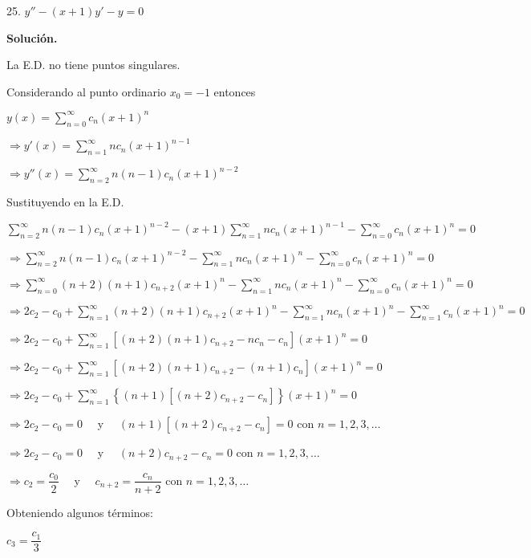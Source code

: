 \documentclass[fleqn]{article}
\begin{document}
    25. $ y'' - (x + 1)y' - y = 0 $

    \textbf{Solución.}

    La E.D. no tiene puntos singulares.

    Considerando al punto ordinario $ x_0 = -1 $ entonces
    
    $ y(x) = \displaystyle \sum_{n=0}^{\infty} c_n (x+1)^n $

    $ \Longrightarrow y'(x) = \displaystyle \sum_{n=1}^{\infty} n c_n (x+1)^{n-1} $

    $ \Longrightarrow y''(x) = \displaystyle \sum_{n=2}^{\infty} n(n-1) c_n (x+1)^{n-2} $
    
    Sustituyendo en la E.D.

    $ \displaystyle \sum_{n=2}^{\infty} n(n-1) c_n (x+1)^{n-2} - (x + 1)\sum_{n=1}^{\infty} n c_n (x+1)^{n-1} - \sum_{n=0}^{\infty} c_n (x+1)^n = 0 $

    $ \Longrightarrow \displaystyle \sum_{n=2}^{\infty} n(n-1) c_n (x+1)^{n-2} - \sum_{n=1}^{\infty} n c_n (x+1)^n - \sum_{n=0}^{\infty} c_n (x+1)^n = 0 $

    $ \Longrightarrow \displaystyle \sum_{n=0}^{\infty} (n+2)(n+1) c_{n+2} (x+1)^n - \sum_{n=1}^{\infty} n c_n (x+1)^n - \sum_{n=0}^{\infty} c_n (x+1)^n = 0 $

    $ \Longrightarrow \displaystyle 2c_2 - c_0 + \sum_{n=1}^{\infty} (n+2)(n+1) c_{n+2} (x+1)^n - \sum_{n=1}^{\infty} n c_n (x+1)^n - \sum_{n=1}^{\infty} c_n (x+1)^n = 0 $

    $ \Longrightarrow \displaystyle 2c_2 - c_0 + \sum_{n=1}^{\infty} [(n+2)(n+1) c_{n+2} - n c_n - c_n] (x+1)^n = 0 $

    $ \Longrightarrow \displaystyle 2c_2 - c_0 + \sum_{n=1}^{\infty} [(n+2)(n+1) c_{n+2} - (n+1) c_n] (x+1)^n = 0 $

    $ \Longrightarrow \displaystyle 2c_2 - c_0 + \sum_{n=1}^{\infty} \left\lbrace (n+1) [(n+2) c_{n+2} - c_n] \right\rbrace (x+1)^n = 0 $

    $ \Longrightarrow 2c_2 - c_0 = 0 \quad $ y $ \quad (n+1) [(n+2) c_{n+2} - c_n] = 0 $ con $ n = 1,2,3, \ldots $

    $ \Longrightarrow 2c_2 - c_0 = 0 \quad $ y $ \quad (n+2) c_{n+2} - c_n = 0 $ con $ n = 1,2,3, \ldots $

    $ \Longrightarrow c_2 = \dfrac{c_0}{2} \quad $ y $ \quad c_{n+2} = \dfrac{c_n}{n+2} $ con $ n = 1,2,3, \ldots $

    Obteniendo algunos términos:

    $ c_3 = \dfrac{c_1}{3} $
\end{document}
